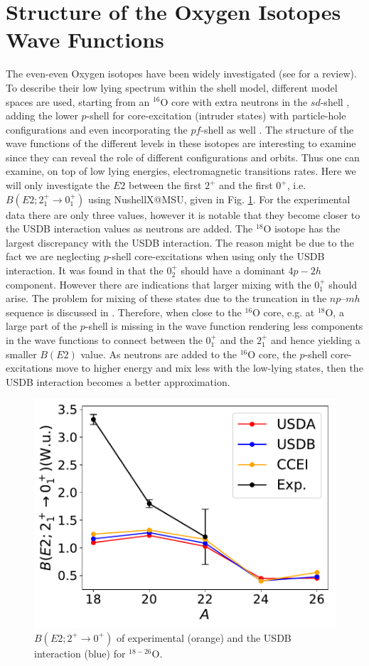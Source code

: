 \documentclass[aps,prl,reprint,groupedaddress]{revtex4-1}  %
\begin{document}
\section{Structure of the Oxygen Isotopes Wave Functions}
The even-even Oxygen isotopes have been widely investigated (see \cite{Brown2017} for a review). To describe their low lying spectrum within the shell model, different model spaces are used, starting from an $^{16}$O core with extra neutrons in the $sd$-shell \cite{Kuo1966,Wildenthal1984,Brown1988,Brown2006}, adding the lower $p$-shell for core-excitation (intruder states) with particle-hole configurations \cite{Lawson1976} and even incorporating the $pf$-shell as well \cite{Utsuno1999}. The structure of the wave functions of the different levels in these isotopes are interesting to examine since they can reveal the role of different configurations and orbits. Thus one can examine, on top of low lying energies, electromagnetic transitions rates. Here we will only investigate the $E2$ between the first $2^+$ and the first $0^+$, i.e. $B(E2; 2_1^+ \rightarrow 0_1^+)$ using NushellX@MSU, given in Fig. \ref{oxygen-be2}. For the experimental data there are only three values, however it is notable that they become closer to the USDB interaction values as neutrons are added. The $^{18}$O isotope has the largest discrepancy with the USDB interaction. The reason might be due to the fact we are neglecting $p$-shell core-excitations when using only the USDB interaction. It was found in \cite{Lawson1976} that the $0_2^+$ should have a dominant $4p-2h$ component. However there are indications that larger mixing with the $0_1^+$ should arise. The problem for mixing of these states due to the truncation in the $np–mh$ sequence is discussed in \cite{Warburton1992a}. Therefore, when close to the $^{16}$O core, e.g. at $^{18}$O, a large part of the $p$-shell is missing in the wave function rendering less components in the wave functions to connect between the $0_1^+$ and the $2_1^+$ and hence yielding a smaller $B(E2)$ value. As neutrons are added to the $^{16} $O core, the $p$-shell core-excitations move to higher energy and mix less with the low-lying states, then the USDB interaction becomes a better approximation. 

\begin{figure}[h]
\includegraphics[width=1\linewidth]{../figures/oxygen-be2.pdf}
\caption{$B(E2; 2^+ \rightarrow 0^+)$ of experimental (orange) and the USDB interaction (blue) for $^{18-26}$O. \label{oxygen-be2}}
\end{figure}


\end{document}

